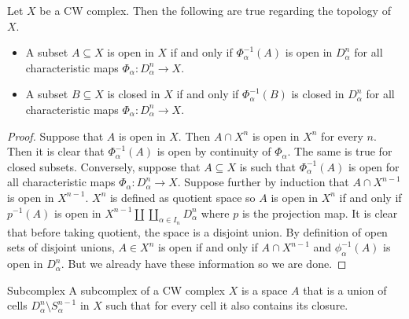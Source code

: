 \documentclass[a4paper]{article}
\begin{document}
\begin{prp}{}{} Let $X$ be a CW complex. Then the following are true regarding the topology of $X$. 
\begin{itemize}
\item A subset $A\subseteq X$ is open in $X$ if and only if $\Phi_\alpha^{-1}(A)$ is open in $D_\alpha^n$ for all characteristic maps $\Phi_\alpha:D_\alpha^n\to X$. 
\item A subset $B\subseteq X$ is closed in $X$ if and only if $\Phi_\alpha^{-1}(B)$ is closed in $D_\alpha^n$ for all characteristic maps $\Phi_\alpha:D_\alpha^n\to X$. 
\end{itemize} \tcbline
\begin{proof}
Suppose that $A$ is open in $X$. Then $A\cap X^n$ is open in $X^n$ for every $n$. Then it is clear that $\Phi_\alpha^{-1}(A)$ is open by continuity of $\Phi_\alpha$. The same is true for closed subsets. Conversely, suppose that $A\subseteq X$ is such that $\Phi_\alpha^{-1}(A)$ is open for all characteristic maps $\Phi_\alpha:D_\alpha^n\to X$. Suppose further by induction that $A\cap X^{n-1}$ is open in $X^{n-1}$. $X^n$ is defined as quotient space so $A$ is open in $X^n$ if and only if $p^{-1}(A)$ is open in $X^{n-1}\amalg\coprod_{\alpha\in I_n}D_\alpha^n$ where $p$ is the projection map. It is clear that before taking quotient, the space is a disjoint union. By definition of open sets of disjoint unions, $A\in X^n$ is open if and only if $A\cap X^{n-1}$ and $\phi_\alpha^{-1}(A)$ is open in $D_\alpha^n$. But we already have these information so we are done. 
\end{proof}
\end{prp}

\begin{defn}{Subcomplex}{} A subcomplex of a CW complex $X$ is a space $A$ that is a union of cells $D_\alpha^n\setminus S_\alpha^{n-1}$ in $X$ such that for every cell it also contains its closure. 
\end{defn}
\end{document}
